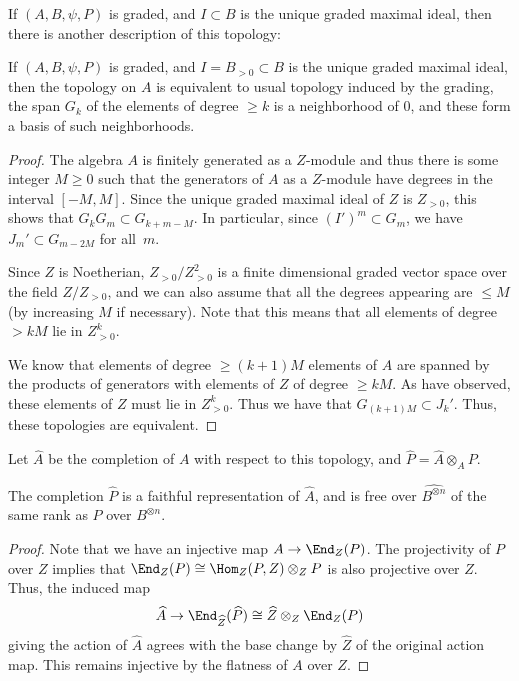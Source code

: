  If $(A,B,\psi,P)$ is graded, and $I\subset B$ is the unique graded
 maximal ideal, then there is another description of this topology:
 \begin{lemma}\label{lem:grading-equivalent}
 If $(A,B,\psi,P)$ is graded, and $I=B_{>0}\subset B$ is the unique graded
 maximal ideal, then the topology on $A$ is equivalent to usual
 topology induced by the grading, \ie the span $G_k$ of the elements of
 degree $\geq k$ is a neighborhood of 0, and these form a basis of
 such neighborhoods.
\end{lemma}
\begin{proof}
The algebra $A$ is finitely generated as a
$Z$-module and thus there is some integer
$M\geq 0$ such that the generators of $ A$ as a $Z$-module have
degrees in the interval $[-M,M]$. Since the unique graded maximal
ideal of $Z$ is $Z_{>0}$, 
this shows that $G_kG_{m}\subset G_{k+m-M}$. In particular, since $(I')^m\subset G_m$, we have $J_m'\subset G_{m-2M}$
for all~$m$.

Since $Z$ is Noetherian,
$Z_{>0}/Z_{>0}^2$ is a finite dimensional graded vector space over the field $Z/Z_{>0}$, and
we can also assume that all the degrees appearing are $\leq M$ (by
increasing $M$ if necessary). Note
that this means that all elements of degree $>kM$ lie in $Z_{>0}^k$. 

We know that elements of degree $\geq (k+1)M$
elements of $A$ are spanned by the products of generators with
elements of $Z$ of degree $\geq kM$. As have observed, these elements
of $Z$ must lie in $Z_{>0}^k$. Thus we have that $G_{(k+1)M}\subset J_k'$.
Thus, these
topologies are equivalent. 
\end{proof}
 \begin{defi}
 Let $\widehat{A}$ be the completion of $A$ with respect to this
 topology, and $\widehat{P}=\widehat{A}\otimes_AP$. 
 \end{defi}

 \begin{lemma}\label{lem:faithful-completion}
 The completion $\widehat{P}$ is a faithful representation of
 $\widehat{A}$, and is free over $\widehat{B^{\otimes n}}$ of the
 same rank as $P$ over $B^{\otimes n}$. 
 \end{lemma}
 \begin{proof}
Note that we have an injective map
$A\to \End_{Z}(P)$. The projectivity of $P$
over $Z$ implies that $ \End_{Z}(P)\cong \Hom_Z(P,Z)\otimes_Z P$ is also
projective over $Z$.
Thus, the induced map
\[\widehat{A}\to \End_{\widehat{Z}}(\widehat{P})\cong
 \widehat{{Z}}\otimes_{Z}\End_{{Z}}(P)
\]
giving the action of $\widehat{A}$ agrees with the base change by
$\widehat{Z}$ of the original action map. This remains injective by
the flatness of $A$ over $Z$. 
 \end{proof}

